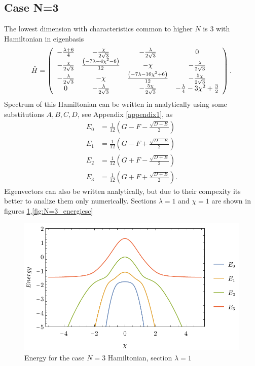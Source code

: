 \subsection{Case N=3}
The lowest dimension with characteristics common to higher $N$ is 3 with Hamiltonian in eigenbasis
\begin{equation}
    \hat{H}=\left(
        \begin{array}{cccc}
         -\frac{ \lambda +6}{4} & -\frac{\chi }{2 \sqrt{3}} & -\frac{\lambda }{2 \sqrt{3}} & 0 \\
         -\frac{\chi }{2 \sqrt{3}} & \frac{ \left(-7 \lambda -4 \chi ^2-6\right)}{12} & -\chi  & -\frac{\lambda }{2 \sqrt{3}} \\
         -\frac{\lambda }{2 \sqrt{3}} & -\chi  & \frac{ \left(-7 \lambda -16 \chi ^2+6\right)}{12} & -\frac{5 \chi }{2 \sqrt{3}} \\
         0 & -\frac{\lambda }{2 \sqrt{3}} & -\frac{5 \chi }{2 \sqrt{3}} & -\frac{\lambda }{4}-3 \chi ^2+\frac{3}{2} \\
        \end{array}
        \right).
\end{equation}
Spectrum of this Hamiltonian can be written in analytically using some substitutions $A,B,C,D$, see Appendix \ref{appendix1}, as
\begin{align}
        E_0 &= \frac{1}{12} \left(G-F-\frac{\sqrt{D-E}}{2}\right)
        \label{eq:N=3_en0}\\
        E_1 &= \frac{1}{12}  \left(G-F+\frac{\sqrt{D-E}}{2}\right)
        \label{eq:N=3_en1}\\
        E_2 &= \frac{1}{12} \left(G+F-\frac{\sqrt{D+E}}{2}\right)
        \label{eq:N=3_en2}\\
        E_3 &= \frac{1}{12}  \left(G+F+\frac{\sqrt{D+E}}{2}\right).
        \label{eq:N=3_en3}
\end{align}
Eigenvectors can also be written analytically, but due to their compexity its better to analize them only numerically. Sections $\lambda=1$ and $\chi=1$ are shown in figures \ref{fig:N=3_energiesl},\ref{fig:N=3_energiesc}
\begin{figure}[h]
    \centering
    \includegraphics{../img/N=3_energiesl.pdf}
    \caption{Energy for the case $N=3$ Hamiltonian, section $\lambda=1$}
    \label{fig:N=3_energiesl}
\end{figure}
